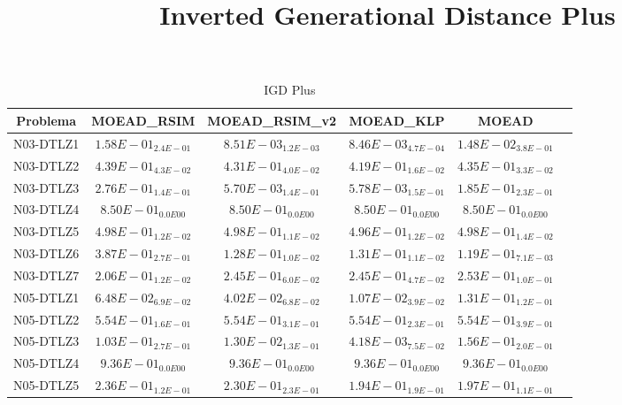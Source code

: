 \documentclass{article}
\title{Inverted Generational Distance Plus}
\author{}
\begin{document}
\maketitle
\begin{table*}[ht!]
\scriptsize
\caption{IGD Plus}
\centering\begin{tabular}{|c||c||c||c||c||c|} \hline
Problema &MOEAD_RSIM &MOEAD_RSIM_v2 &MOEAD_KLP &MOEAD\\\hline
N03-DTLZ1 &$1.58E-01_{2.4E-01}$ &\cellcolor{gray25}$8.51E-03_{1.2E-03}$ &\cellcolor{gray95}$8.46E-03_{4.7E-04}$ &$1.48E-02_{3.8E-01}$\\ 
\hline
N03-DTLZ2 &$4.39E-01_{4.3E-02}$ &\cellcolor{gray25}$4.31E-01_{4.0E-02}$ &\cellcolor{gray95}$4.19E-01_{1.6E-02}$ &$4.35E-01_{3.3E-02}$\\ 
\hline
N03-DTLZ3 &$2.76E-01_{1.4E-01}$ &\cellcolor{gray95}$5.70E-03_{1.4E-01}$ &\cellcolor{gray25}$5.78E-03_{1.5E-01}$ &$1.85E-01_{2.3E-01}$\\ 
\hline
N03-DTLZ4 &\cellcolor{gray95}$8.50E-01_{0.0E00}$ &\cellcolor{gray25}$8.50E-01_{0.0E00}$ &$8.50E-01_{0.0E00}$ &$8.50E-01_{0.0E00}$\\ 
\hline
N03-DTLZ5 &\cellcolor{gray25}$4.98E-01_{1.2E-02}$ &$4.98E-01_{1.1E-02}$ &\cellcolor{gray95}$4.96E-01_{1.2E-02}$ &$4.98E-01_{1.4E-02}$\\ 
\hline
N03-DTLZ6 &$3.87E-01_{2.7E-01}$ &\cellcolor{gray25}$1.28E-01_{1.0E-02}$ &$1.31E-01_{1.1E-02}$ &\cellcolor{gray95}$1.19E-01_{7.1E-03}$\\ 
\hline
N03-DTLZ7 &\cellcolor{gray95}$2.06E-01_{1.2E-02}$ &\cellcolor{gray25}$2.45E-01_{6.0E-02}$ &$2.45E-01_{4.7E-02}$ &$2.53E-01_{1.0E-01}$\\ 
\hline
N05-DTLZ1 &$6.48E-02_{6.9E-02}$ &\cellcolor{gray25}$4.02E-02_{6.8E-02}$ &\cellcolor{gray95}$1.07E-02_{3.9E-02}$ &$1.31E-01_{1.2E-01}$\\ 
\hline
N05-DTLZ2 &\cellcolor{gray95}$5.54E-01_{1.6E-01}$ &$5.54E-01_{3.1E-01}$ &\cellcolor{gray25}$5.54E-01_{2.3E-01}$ &$5.54E-01_{3.9E-01}$\\ 
\hline
N05-DTLZ3 &$1.03E-01_{2.7E-01}$ &\cellcolor{gray25}$1.30E-02_{1.3E-01}$ &\cellcolor{gray95}$4.18E-03_{7.5E-02}$ &$1.56E-01_{2.0E-01}$\\ 
\hline
N05-DTLZ4 &\cellcolor{gray95}$9.36E-01_{0.0E00}$ &\cellcolor{gray25}$9.36E-01_{0.0E00}$ &$9.36E-01_{0.0E00}$ &$9.36E-01_{0.0E00}$\\ 
\hline
N05-DTLZ5 &$2.36E-01_{1.2E-01}$ &$2.30E-01_{2.3E-01}$ &\cellcolor{gray95}$1.94E-01_{1.9E-01}$ &\cellcolor{gray25}$1.97E-01_{1.1E-01}$\\ 

\end{tabular}
\end{table*}
\end{document}
